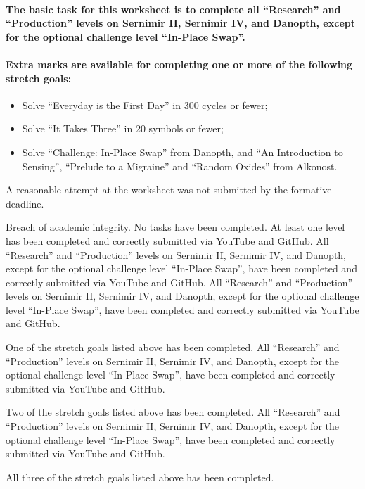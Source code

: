 \documentclass{../../../fal_assignment}
\begin{document}
\paragraph{
The basic task for this worksheet is to complete \textbf{all} ``Research'' and ``Production'' levels on Sernimir II, Sernimir IV, and Danopth, except for the optional challenge level ``In-Place Swap''.
}

\paragraph{
Extra marks are available for completing one or more of the following stretch goals:
}
	\begin{itemize}
		\item Solve ``Everyday is the First Day'' in 300 cycles or fewer;
		\item Solve ``It Takes Three'' in 20 symbols or fewer;
		\item Solve ``Challenge: In-Place Swap'' from Danopth, and ``An Introduction to Sensing'', ``Prelude to a Migraine'' and ``Random Oxides'' from Alkonost.
	\end{itemize}

\begin{markingrubric}
        \grade\fail	A reasonable attempt at the worksheet was not submitted by the formative deadline.
        \par Breach of academic integrity.
        \grade\fail No tasks have been completed.
        \grade At least one level has been completed and correctly submitted via YouTube and GitHub.
        \grade All ``Research'' and ``Production'' levels on Sernimir II, Sernimir IV, and Danopth, except for the optional challenge level ``In-Place Swap'', have been completed and correctly submitted via YouTube and GitHub.
        \grade All ``Research'' and ``Production'' levels on Sernimir II, Sernimir IV, and Danopth, except for the optional challenge level ``In-Place Swap'', have been completed and correctly submitted via YouTube and GitHub.
            \par One of the stretch goals listed above has been completed.
        \grade All ``Research'' and ``Production'' levels on Sernimir II, Sernimir IV, and Danopth, except for the optional challenge level ``In-Place Swap'', have been completed and correctly submitted via YouTube and GitHub.
            \par Two of the stretch goals listed above has been completed.
        \grade All ``Research'' and ``Production'' levels on Sernimir II, Sernimir IV, and Danopth, except for the optional challenge level ``In-Place Swap'', have been completed and correctly submitted via YouTube and GitHub.
            \par All three of the stretch goals listed above has been completed.
\end{markingrubric}
\end{document}
